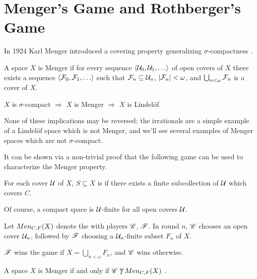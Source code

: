 
\chapter{Menger's Game and Rothberger's Game}

In 1924 Karl Menger introduced a covering property generalizing
$\sigma$-compactness \cite{custom31879423}.

\begin{defn}
  A space $X$ is Menger if for every sequence $\<\mc U_0,\mc U_1,\dots\>$
  of open covers of $X$ there exists a sequence
  $\<\mc F_0,\mc F_1,\dots\>$ such that $\mathcal{F}_n\subseteq \mathcal{U}_n$,
  $|\mathcal{F}_n|<\omega$, and $\bigcup_{n<\omega}\mathcal{F}_n$ is a cover of $X$.
\end{defn}

\begin{prop}
  $X$ is $\sigma$-compact
    $\Rightarrow$
  $X$ is Menger
    $\Rightarrow$
  $X$ is Lindel\"of.
\end{prop}

None of these implications may be reversed; the irrationals are a simple example
of a Lindel\"of space which is not Menger, and we'll see several examples of
Menger spaces which are not $\sigma$-compact.

It can be shown via a non-trivial
proof that the following game can be used to characterize the Menger property.

\begin{defn}
  For each cover $\mathcal{U}$ of $X$, $S\subseteq X$ is  if
  there exists a finite subcollection of $\mathcal{U}$ which covers $C$.
\end{defn}

Of course, a compact space is $\mathcal{U}$-finite for all open covers $\mathcal{U}$.

\begin{game}
  Let $Men_{C,F}(X)$ denote the  with players $\mathscr{C}$, $\mathscr{F}$.
  In round $n$, $\mathscr{C}$ chooses an open cover $\mathcal{U}_n$, followed by $\mathscr{F}$
  choosing a $\mathcal{U}_n$-finite subset $F_n$ of $X$.

  $\mathscr{F}$ wins the game if $X = \bigcup_{n<\omega}F_n$,
  and $\mathscr{C}$ wins otherwise.
\end{game}

\begin{thm}
  A space $X$ is Menger if and only if $\mathscr{C}\not\uparrow Men_{C,F}(X)$
  \cite{MR1544773}.
\end{thm}

